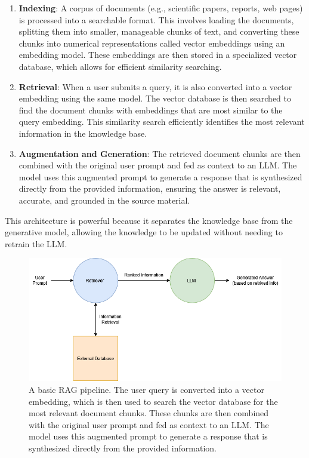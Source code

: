 \begin{enumerate}
    \item \textbf{Indexing}: A corpus of documents (e.g., scientific papers, reports, web pages) is processed into a searchable format. This involves loading the documents, splitting them into smaller, manageable chunks of text, and converting these chunks into numerical representations called vector embeddings using an embedding model. These embeddings are then stored in a specialized vector database, which allows for efficient similarity searching.
    \item \textbf{Retrieval}: When a user submits a query, it is also converted into a vector embedding using the same model. The vector database is then searched to find the document chunks with embeddings that are most similar to the query embedding. This similarity search efficiently identifies the most relevant information in the knowledge base.
    \item \textbf{Augmentation and Generation}: The retrieved document chunks are then combined with the original user prompt and fed as context to an LLM. The model uses this augmented prompt to generate a response that is synthesized directly from the provided information, ensuring the answer is relevant, accurate, and grounded in the source material.
\end{enumerate}

This architecture is powerful because it separates the knowledge base from the generative model, allowing the knowledge to be updated without needing to retrain the LLM.

\begin{figure}[H]
    \centering
    \includegraphics[width=\textwidth]{figures/basic_rag.png}
    \caption{A basic RAG pipeline. The user query is converted into a vector embedding, which is then used to search the vector database for the most relevant document chunks. These chunks are then combined with the original user prompt and fed as context to an LLM. The model uses this augmented prompt to generate a response that is synthesized directly from the provided information.}
    \label{fig:basic_rag}
\end{figure}

